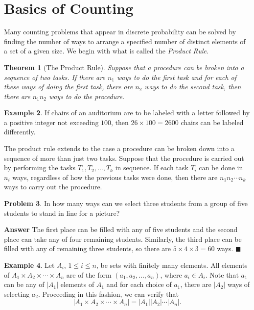 \documentclass[12pt,letterpaper]{book}
\numberwithin{equation}{section}
\newtheorem{thm}{\textbf{Theorem}}[section]
\theoremstyle{definition}
\newtheorem{problem}[thm]{\textbf{Problem}}
\newtheorem{example}[thm]{\textbf{Example}}
\newenvironment{answer}{\noindent\textbf{Answer}}{\hfill$\blacksquare$\vspace{0.1in}}
\begin{document}
\section{Basics of Counting}

Many counting problems that appear in discrete probability can be solved by finding the number of ways to arrange a specified number of distinct elements of a set of a given size. We begin with what is called the \textit{Product Rule}.

\begin{thm}[The Product Rule] Suppose that a procedure can be broken into a sequence of two tasks. If there are $n_1$ ways to do the first task and for each of these ways of doing the first task, there are $n_2$ ways to do the second task, then there are $n_1n_2$ ways to do the procedure.
\end{thm}

\begin{example} If chairs of an auditorium are to be labeled with a letter followed by a positive integer not exceeding $100$, then $26\times 100=2600$ chairs can be labeled differently.
\end{example}

The product rule extends to the case a procedure can be broken down into a sequence of more than just two tasks. Suppose that the procedure is carried out by performing the tasks $T_1,T_2,\ldots, T_k$ in sequence. If each task $T_i$ can be done in $n_i$ ways, regardless of how the previous tasks were done, then there are $n_1n_2\cdots n_k$ ways to carry out the procedure.

\begin{problem}\label{5p3 permutation} In how many ways can we select three students from a group of five students to stand in line for a picture?
\end{problem}

\begin{answer}
The first place can be filled with any of five students and the second place can take any of four remaining students. Similarly, the third place can be filled with any of remaining three students, so there are $5\times 4\times 3 =60$ ways.
\end{answer}

\begin{example}\label{prod rule cartesian}
Let $A_i$, $1\leq i \leq n$, be sets with finitely many elements. All elements of $A_1\times A_2\times \cdots \times A_n$ are of the form $(a_1,a_2,\ldots,a_n)$, where $a_i\in A_i$. Note that $a_1$ can be any of $|A_1|$ elements of $A_1$ and for each choice of $a_1$, there are $|A_2|$ ways of selecting $a_2$. Proceeding in this fashion, we can verify that
$$|A_1\times A_2 \times \cdots \times A_n|=|A_1||A_2|\cdots|A_n|.$$
\end{example}
\end{document}
